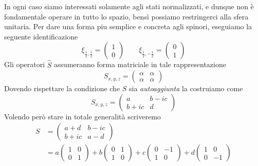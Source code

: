 In ogni caso siamo interessati solamente agli stati normalizzati, e
dunque non è fondamentale operare in tutto lo spazio, bensì possiamo
restringerci alla sfera unitaria.
Per dare una forma piu semplice e concreta agli spinori, eseguiamo la
seguente identificazione
\[
                             \xi_{\frac{1}{2}, \frac{1}{2}} =
                             \begin{pmatrix}
                                 1 \\ 0
                             \end{pmatrix} \qquad
                             \xi_{\frac{1}{2}, - \frac{1}{2}} =
                             \begin{pmatrix}
                                 0 \\ 1
                             \end{pmatrix}
\] Gli operatori \(\hat{S}\) assumeranno forma matriciale in tale
rappresentazione \[
                     S_{x,y,z} =
                     \begin{pmatrix}
                         \alpha & \alpha \\
                         \alpha & \alpha
                     \end{pmatrix}
\] Dovendo rispettare la condizione che \(S\) sia \emph{autoaggiunta} la
costruiamo come \[
                    S_{x,y,z} =
                    \begin{pmatrix}
                        a      & b - ic \\
                        b + ic & d
                    \end{pmatrix}
\] Volendo però stare in totale generalità scriveremo
\begin{align*}
    S & =
    \begin{pmatrix}
        a + d & b-ic \\
        b+ic  & a-d
    \end{pmatrix} \\
    & =
    a
    \begin{pmatrix}
        1 & 0 \\
        0 & 1
    \end{pmatrix}
    + b \begin{pmatrix}
            0 & 1 \\
            1 & 0
    \end{pmatrix}
    + c \begin{pmatrix}
            0 & -1 \\
            1 & 0
    \end{pmatrix}
    +d \begin{pmatrix}
           1 & 0  \\
           0 & -1
    \end{pmatrix}
\end{align*}

